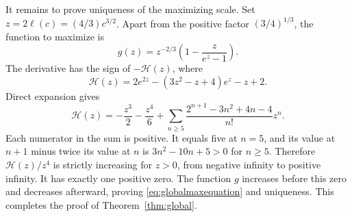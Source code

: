 \documentclass[11pt]{article}
\theoremstyle{definition}
\theoremstyle{remark}
\newcommand{\1}{\mathbf 1}
\begin{document}
It remains to prove uniqueness of the maximizing scale. Set $z=2\ell(c)=(4/3)c^{3/2}$. Apart from the positive factor $(3/4)^{1/3}$, the function to maximize is
\[
g(z)=z^{-2/3}\left(1-\frac z{e^z-1}\right).
\]
The derivative has the sign of $-\mathcal H(z)$, where
\[
\mathcal H(z)=2e^{2z}-(3z^2-z+4)e^z-z+2.
\]
Direct expansion gives
\[
\mathcal H(z)=-\frac{z^3}2-\frac{z^4}6
+\sum_{n\ge5}\frac{2^{n+1}-3n^2+4n-4}{n!}z^n.
\]
Each numerator in the sum is positive. It equals five at $n=5$, and its value at $n+1$ minus twice its value at $n$ is $3n^2-10n+5>0$ for $n\ge5$. Therefore $\mathcal H(z)/z^4$ is strictly increasing for $z>0$, from negative infinity to positive infinity. It has exactly one positive zero. The function $g$ increases before this zero and decreases afterward, proving \eqref{eq:globalmaxequation} and uniqueness. This completes the proof of Theorem~\ref{thm:global}.

\end{document}
